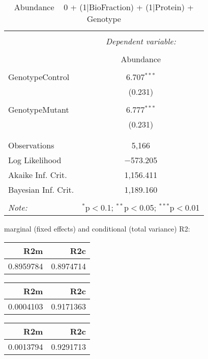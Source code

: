\documentclass[11pt]{report}
\begin{document}
\begin{table}[!htbp] \centering 
  \caption{Abundance ~ 0 + (1|BioFraction) + (1|Protein) + Genotype} 
  \label{} 
\begin{tabular}{@{\extracolsep{5pt}}lc} 
\\[-1.8ex]\hline 
\hline \\[-1.8ex] 
 & \multicolumn{1}{c}{\textit{Dependent variable:}} \\ 
\cline{2-2} 
\\[-1.8ex] & Abundance \\ 
\hline \\[-1.8ex] 
 GenotypeControl & 6.707$^{***}$ \\ 
  & (0.231) \\ 
  & \\ 
 GenotypeMutant & 6.777$^{***}$ \\ 
  & (0.231) \\ 
  & \\ 
\hline \\[-1.8ex] 
Observations & 5,166 \\ 
Log Likelihood & $-$573.205 \\ 
Akaike Inf. Crit. & 1,156.411 \\ 
Bayesian Inf. Crit. & 1,189.160 \\ 
\hline 
\hline \\[-1.8ex] 
\textit{Note:}  & \multicolumn{1}{r}{$^{*}$p$<$0.1; $^{**}$p$<$0.05; $^{***}$p$<$0.01} \\ 
\end{tabular} 
\end{table} 
marginal (fixed effects) and conditional (total variance) R2:

\begin{tabular}{r|r}
\hline
R2m & R2c\\
\hline
0.8959784 & 0.8974714\\
\hline
\end{tabular}

\begin{tabular}{r|r}
\hline
R2m & R2c\\
\hline
0.0004103 & 0.9171363\\
\hline
\end{tabular}

\begin{tabular}{r|r}
\hline
R2m & R2c\\
\hline
0.0013794 & 0.9291713\\
\hline
\end{tabular}
\end{document}
